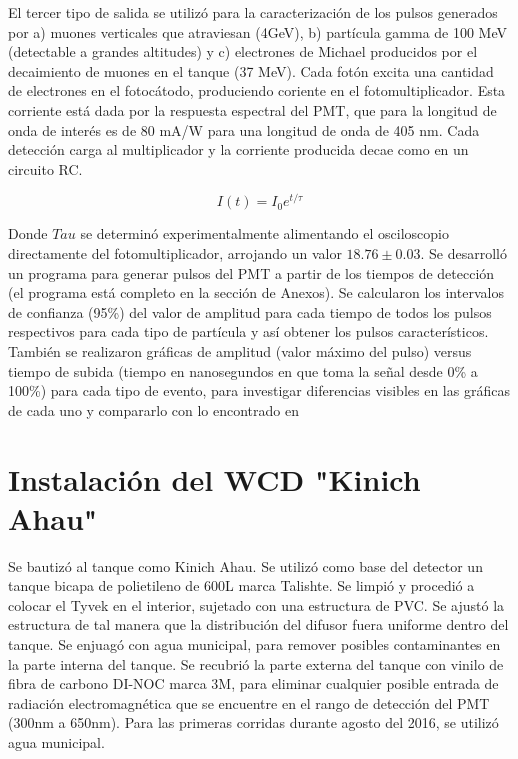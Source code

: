 \documentclass{book}
\begin{document}
El tercer tipo de salida se utiliz\'o para la caracterizaci\'on de los pulsos generados por a) muones verticales que atraviesan (4GeV), b) part\'icula gamma de 100 MeV (detectable a grandes altitudes) y c) electrones de Michael producidos por el decaimiento de muones en el tanque (37 MeV). Cada fot\'on excita una cantidad de electrones en el fotoc\'atodo, produciendo coriente en el fotomultiplicador. Esta corriente est\'a dada por la respuesta espectral del PMT, que para la longitud de onda de inter\'es es de 80 mA/W para una longitud de onda de 405 nm. Cada detecci\'on carga al multiplicador y la corriente producida decae como en un circuito RC.

\begin{equation}
I(t)=I_0e^{t/\tau}
\end{equation}

Donde $Tau$ se determin\'o experimentalmente alimentando el osciloscopio directamente del fotomultiplicador, arrojando un valor $18.76\pm0.03$. Se desarroll\'o un programa para generar pulsos del PMT a partir de los tiempos de detecci\'on (el programa est\'a completo en la secci\'on de Anexos). Se calcularon los intervalos de confianza (95\%) del valor de amplitud para cada tiempo de todos los pulsos respectivos para cada tipo de part\'icula y as\'i obtener los pulsos caracter\'isticos. Tambi\'en se realizaron gr\'aficas de amplitud (valor m\'aximo del pulso) versus tiempo de subida (tiempo en nanosegundos en que toma la se\~nal desde 0\% a 100\%) para cada tipo de evento, para investigar diferencias visibles en las gr\'aficas de cada uno y compararlo con lo encontrado en \citep{Salazar}

\section{Instalaci\'on del WCD "Kinich Ahau"}
Se bautiz\'o al tanque como Kinich Ahau. Se utiliz\'o como base del detector un tanque bicapa de polietileno de 600L marca Talishte. Se limpi\'o y procedi\'o a colocar el Tyvek en el interior, sujetado con una estructura de PVC. Se ajust\'o la estructura de tal manera que la distribuci\'on del difusor fuera uniforme dentro del tanque. Se enjuag\'o con agua municipal, para remover posibles contaminantes en la parte interna del tanque. Se recubri\'o la parte externa del tanque con vinilo de fibra de carbono DI-NOC marca 3M, para eliminar cualquier posible entrada de radiaci\'on electromagn\'etica que se encuentre en el rango de detecci\'on del PMT (300nm a 650nm). Para las primeras corridas durante agosto del 2016, se utiliz\'o agua municipal.
\end{document}
